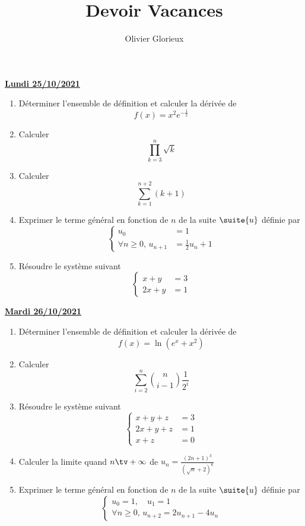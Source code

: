 \documentclass[a4paper, 11pt,reqno]{article}
\author{Olivier Glorieux}
\newcommand{\jour}[1]{
\begin{center}
\underline{\textbf{#1}}
\end{center}

 }
\begin{document}
\title{Devoir Vacances
}

\begin{center}
\underline{\textbf{Lundi 25/10/2021}}
\end{center}

\begin{exercice}
\begin{enumerate}
\item Déterminer l'ensemble de définition et calculer la dérivée de
$$f(x)=x^2e^{-\frac{1}{x}}$$
\item Calculer $$\prod_{k=3}^n \sqrt{k}$$ 
\item Calculer 
$$\sum_{k=1}^{n+2} (k+1)$$
\item Exprimer le terme général en fonction de $n$ de la suite $\suite{u}$ définie par 
$$\left\{\begin{array}{rl}
u_0 &=1\\
\forall n\geq 0,\,  u_{n+1}&= \frac{1}{2}u_n +1
\end{array}\right.$$
\item Résoudre le système suivant 
$$\left\{ 
\begin{array}{cc}
x+y&=3\\
2x+y&=1
\end{array}
\right.$$
\end{enumerate}
\end{exercice}







\jour{Mardi 26/10/2021}
\begin{exercice}
\begin{enumerate}
\item  Déterminer l'ensemble de définition et calculer la dérivée de
$$f(x) =\ln(e^x+x^2)$$
\item Calculer $$\sum_{i=2}^n \binom{n}{i-1}\frac{1}{2^{i} }$$ 
\item  Résoudre le système suivant 
$$\left\{ 
\begin{array}{cc}
x+y+z&=3\\
2x+y+z&=1\\
x+z&=0
\end{array}
\right.$$
\item Calculer la limite quand $n\tv+\infty$ de $u_n=\frac{(2n+1)^3}{(\sqrt{n}+2)^6}$
\item Exprimer le terme général en fonction de $n$ de la suite $\suite{u}$ définie par 
$$\left\{\begin{array}{l}
u_0 =1,\quad u_1=1\\
\forall n\geq 0,\,  u_{n+2}= 2u_{n+1}-4u_n
\end{array}\right.$$
\end{enumerate}
\end{exercice}
\end{document}
